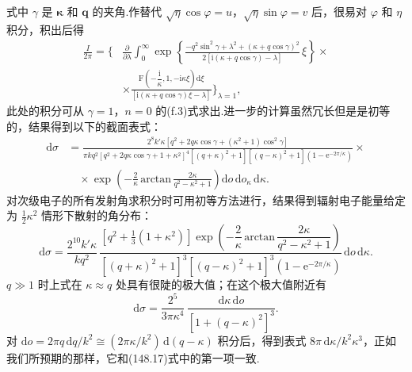 式中 $\gamma$ 是 $\boldsymbol{\kappa}$ 和 $\boldsymbol{q}$ 的夹角.作替代 $\sqrt{\eta}\cos\varphi=u$，$\sqrt{\eta}\sin\varphi=v$ 后，很易对 $\varphi$ 和 $\eta$ 积分，积出后得
\begin{equation*}
\begin{aligned}
  \frac{I}{2\pi}=\bigg\{&\frac{\partial}{\partial\lambda}\int_0^{\infty}
  \exp\left\{\frac{-q^2\sin^2\gamma+\lambda^2+(\kappa+q\cos\gamma)^2}
  {2\left[\mathrm{i}(\kappa+q\cos\gamma)-\lambda\right]}\,\xi\right\}\times\\
  &\times\frac{\mathrm{F}\left(-\dfrac{\mathrm{i}}{\kappa},1,-\mathrm{i}\kappa\xi\right)\mathrm{d}\xi}
  {\left[\mathrm{i}(\kappa+q\cos\gamma)\xi-\lambda\right]}\bigg\}_{\lambda=1},
\end{aligned}
\end{equation*}
此处的积分可从 $\gamma=1$，$n=0$ 的(f.3)式求出.进一步的计算虽然冗长但是是初等的，结果得到以下的截面表式：
\begin{equation*}
\begin{aligned}
  \mathrm{d}\sigma&=\frac{2^8k'\kappa\left[q^2+2q\kappa\cos\gamma+(\kappa^2+1)\cos^2\gamma\right]}
  {\pi kq^2\left[q^2+2q\kappa\cos\gamma+1+\kappa^2\right]^4
  \left[(q+\kappa)^2+1\right]\left[(q-\kappa)^2+1\right]\left(1-\mathrm{e}^{-2\pi/\kappa}\right)}\times\\
  &\quad\times\exp\left(-\frac{2}{\kappa}\,\mathrm{arctan}\,\frac{2\kappa}{q^2-\kappa^2+1}\right)
  \mathrm{d}o\,\mathrm{d}o_{\kappa}\,\mathrm{d}\kappa.
\end{aligned}
\end{equation*}
对次级电子的所有发射角求积分时可用初等方法进行，结果得到辐射电子能量给定为 $\frac{1}{2}\kappa^2$ 情形下散射的角分布：
\begin{equation*}
  \mathrm{d}\sigma=\frac{2^{10}k'\kappa}{kq^2}\,
  \frac{\left[q^2+\frac{1}{3}(1+\kappa^2)\right]
  \exp\left(-\dfrac{2}{\kappa}\,\mathrm{arctan}\,\dfrac{2\kappa}{q^2-\kappa^2+1}\right)}
  {\left[(q+\kappa)^2+1\right]^3\left[(q-\kappa)^2+1\right]^3\left(1-\mathrm{e}^{-2\pi/\kappa}\right)}\,
  \mathrm{d}o\,\mathrm{d}\kappa.
\end{equation*}
$q\gg1$ 时上式在 $\kappa\approx q$ 处具有很陡的极大值；在这个极大值附近有
\begin{equation*}
  \mathrm{d}\sigma=\frac{2^5}{3\pi\kappa^4}\,
  \frac{\mathrm{d}\kappa\,\mathrm{d}o}{\left[1+(q-\kappa)^2\right]^3}.
\end{equation*}
对 $\mathrm{d}o=2\pi q\,\mathrm{d}q/k^2\cong(2\pi\kappa/k^2)\,\mathrm{d}(q-\kappa)$ 积分后，得到表式 $8\pi\,\mathrm{d}\kappa/k^2\kappa^3$，正如我们所预期的那样，它和(148.17)式中的第一项一致.
\par%

